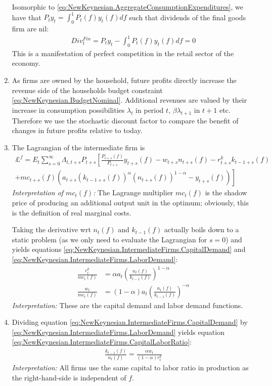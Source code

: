 \begin{enumerate}
Isomorphic to \eqref{eq:NewKeynesian.AggregateConsumptionExpenditures},
  we have that $P_t y_t= \int_{0}^{1} P_t(f) y_t(f) df$ such that dividends of the final goods firm are nil:
\begin{align*}
Div_t^{Fin} = P_t y_t - \int_{0}^{1} P_t(f) y_t(f) df = 0
\end{align*}
This is a manifestation of perfect competition in the retail sector of the economy.

\item As firms are owned by the household, future profits directly increase the revenue side of the households budget constraint \eqref{eq:NewKeynesian.BudgetNominal}.
Additional revenues are valued by their increase in consumption possibilities $\lambda_t$ in period $t$, $\beta \lambda_{t+1}$ in $t+1$ etc.
Therefore we use the stochastic discount factor to compare the benefit of changes in future profits relative to today.

\item The Lagrangian of the intermediate firm is 
\begin{multline}
\pounds^f = E_t \sum_{s=0}^{\infty}\Lambda_{t,t+s} P_{t+s} \left[\frac{P_{t+s}(f)}{P_{t+s}} y_{t+s}(f) - w_{t+s} n_{t+s}(f) - r^k_{t+s} k_{t-1+s}(f) \right.
\\
\left.
+ mc_{t+s}(f)\left(a_{t+s}(k_{t-1+s}(f))^\alpha (n_{t+s}(f))^{1-\alpha} - y_{t+s}(f)\right)\right]
\label{eq:IntermediateFirms.Lagrangian}
\end{multline}
\emph{Interpretation of $mc_t(f)$:} The Lagrange multiplier $mc_t(f)$ is the shadow price of producing an additional output unit in the optimum;
  obviously, this is the definition of real marginal costs.

Taking the derivative wrt $n_t(f)$ and $k_{t-1}(f)$ actually boils down to a static problem (as we only need to evaluate the Lagrangian for $s=0$)
  and yields equations \eqref{eq:NewKeynesian.IntermediateFirms.CapitalDemand} and \eqref{eq:NewKeynesian.IntermediateFirms.LaborDemand}:
\begin{align*}
\frac{r^k_t}{mc_t(f)} &= \alpha a_t \left( \frac{n_t(f)}{k_{t-1}(f)}\right)^{1-\alpha}
\\
\frac{w_t}{mc_t(f)} &= (1-\alpha) a_t \left(\frac{n_t(f)}{k_{t-1}(f)}\right)^{-\alpha}
\end{align*}
\emph{Interpretation:} These are the capital demand and labor demand functions.

\item Dividing equation \eqref{eq:NewKeynesian.IntermediateFirms.CapitalDemand} by \eqref{eq:NewKeynesian.IntermediateFirms.LaborDemand} yields equation \eqref{eq:NewKeynesian.IntermediateFirms.CapitalLaborRatio}:
\begin{align*}
\frac{k_{t-1}(f)}{n_t(f)} = \frac{\alpha w_t}{(1-\alpha)r^k_t}
\end{align*}
\emph{Interpretation:} All firms use the same capital to labor ratio in production as the right-hand-side is independent of $f$.


\end{enumerate}
